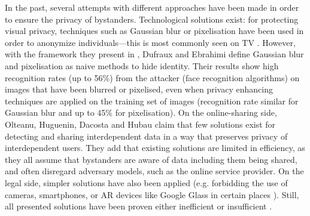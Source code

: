 \documentclass[conference]{IEEEtran}
\begin{document}
In the past, several attempts with different approaches have been made in order to ensure the privacy of bystanders. Technological solutions exist: for protecting visual privacy, techniques such as Gaussian blur or pixelisation have been used in order to anonymize individuals---this is most commonly seen on TV \cite{dufaux2010framework}. However, with the framework they present in \cite{dufaux2010framework}, Dufraux and Ebrahimi define Gaussian blur and pixelisation as naive methods to hide identity. Their results show high recognition rates (up to 56\%) from the attacker (face recognition algorithms) on images that have been blurred or pixelised, even when privacy enhancing techniques are applied on the training set of images (recognition rate similar for Gaussian blur and up to 45\% for pixelisation). On the online-sharing side, Olteanu, Huguenin, Dacosta and Hubau \cite{olteanu2018consensual} claim that few solutions exist for detecting and sharing interdependent data in a way that preserves privacy of interdependent users. They add that existing solutions are limited in efficiency, as they all assume that bystanders are aware of data including them being shared, and often disregard adversary models, such as the online service provider. On the legal side, simpler solutions have also been applied (e.g. forbidding the use of cameras, smartphones, or \ac{AR} devices like Google Glass in certain places \cite{shu2016cardea}). Still, all presented solutions have been proven either inefficient or insufficient \cite{shu2016cardea, olteanu2018consensual, dufaux2010framework}. 
\end{document}
